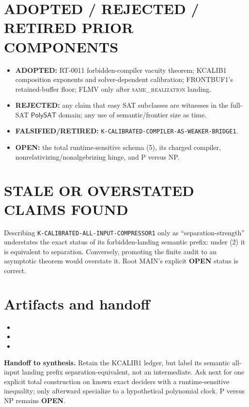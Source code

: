 \documentclass[11pt]{article}
\newcommand{\PolySAT}{\mathsf{PolySAT}}
\newcommand{\OPEN}{\textbf{OPEN}}
\newcommand{\same}{\textsc{same\_realization}}
\begin{document}
\section{ADOPTED / REJECTED / RETIRED PRIOR COMPONENTS}
\begin{itemize}
\item \textbf{ADOPTED:} RT-0011 forbidden-compiler vacuity theorem; KCALIB1
  composition exponents and solver-dependent calibration; FRONTBUF1's
  retained-buffer floor; FLMV only after \same{} landing.
\item \textbf{REJECTED:} any claim that easy SAT subclasses are witnesses in
  the full-SAT $\PolySAT$ domain; any use of semantic/frontier size as time.
\item \textbf{FALSIFIED/RETIRED:}
  \texttt{K-CALIBRATED-COMPILER-AS-WEAKER-BRIDGE1}.
\item \textbf{OPEN:} the total runtime-sensitive schema (5), its charged
  compiler, nonrelativizing/nonalgebrizing hinge, and P versus NP.
\end{itemize}

\section{STALE OR OVERSTATED CLAIMS FOUND}
Describing \texttt{K-CALIBRATED-ALL-INPUT-COMPRESSOR1} only as
``separation-strength'' understates the exact status of its forbidden-landing
semantic prefix: under (2) it is equivalent to separation.  Conversely,
promoting the finite audit to an asymptotic theorem would overstate it.
Root MAIN's explicit \OPEN{} status is correct.

\section{Artifacts and handoff}
\begin{itemize}
\item {}
\item {}
\item {}
\end{itemize}

\noindent\textbf{Handoff to synthesis.} Retain the KCALIB1 ledger, but label
its semantic all-input landing prefix separation-equivalent, not an
intermediate.  Ask next for one explicit total construction on known exact
deciders with a runtime-sensitive inequality; only afterward specialize to
a hypothetical polynomial clock.  P versus NP remains \OPEN.
\end{document}
